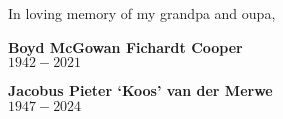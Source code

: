 \begin{dedication} \noindent


    In loving memory of my grandpa and oupa,

    \vspace{\baselineskip}

    \textbf{Boyd McGowan Fichardt Cooper} \\
    $1942 - 2021$

    \vspace{\baselineskip}

    \textbf{Jacobus Pieter `Koos' van der Merwe} \\
    $1947 - 2024$


\end{dedication}


